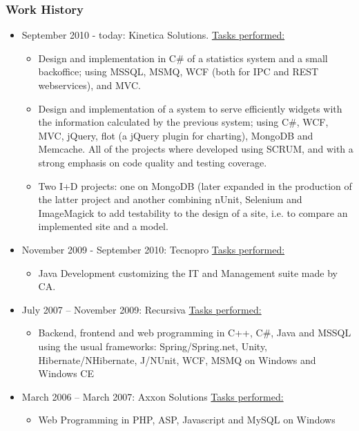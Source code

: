 \subsubsection*{Work History}
\begin{itemize}
	\item September 2010 - today: Kinetica Solutions.
		\subitem \underline{Tasks performed:}
		\begin{itemize}
			\item Design and implementation in C\# of a statistics system and a
				small backoffice; using MSSQL, MSMQ, WCF (both for IPC and
				REST webservices), and MVC.
			\item Design and implementation of a system to serve efficiently widgets with
				the information calculated by the previous system; using 
				C\#, WCF, MVC, jQuery, flot (a jQuery plugin for charting), 
				MongoDB and Memcache.
				\subitem All of the projects where developed using SCRUM, and with a
					strong emphasis on code quality and testing coverage.
			\item Two I+D projects: one on MongoDB (later expanded in the
				production of the latter project and another combining nUnit,
				Selenium and ImageMagick to add testability to the design
				of a site, i.e. to compare an implemented site and a model.
		\end{itemize}
	\item November 2009 - September 2010: Tecnopro
		\subitem \underline{Tasks performed:}
		\begin{itemize}
			\item Java Development customizing the IT and Management suite made by CA.
		\end{itemize}
	\item July 2007 -- November 2009: Recursiva
		\subitem \underline{Tasks performed:}
			\begin{itemize}
				\item Backend, frontend and web programming in C++, C\#, Java and MSSQL 
					using the usual frameworks: Spring/Spring.net, Unity, Hibernate/NHibernate,
					J/NUnit, WCF, MSMQ on Windows and Windows CE
			\end{itemize}

	\item March 2006 -- March 2007: Axxon Solutions
		\subitem \underline{Tasks performed:}
			\begin{itemize}
				\item Web Programming in PHP, ASP, Javascript and MySQL on Windows
			\end{itemize}


\end{itemize}
